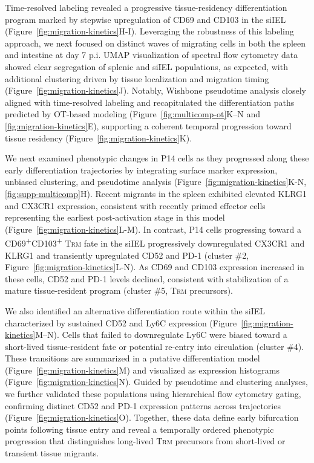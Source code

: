 Time-resolved labeling revealed a progressive tissue-residency differentiation program marked by stepwise upregulation of CD69 and CD103 in the siIEL (Figure~\ref{fig:migration-kinetics}H-I). Leveraging the robustness of this labeling approach, we next focused on distinct waves of migrating cells in both the spleen and intestine at day 7 p.i. UMAP visualization of spectral flow cytometry data showed clear segregation of splenic and siIEL populations, as expected, with additional clustering driven by tissue localization and migration timing (Figure~\ref{fig:migration-kinetics}J). Notably, Wishbone pseudotime analysis closely aligned with time-resolved labeling and recapitulated the differentiation paths predicted by OT-based modeling (Figure~\ref{fig:multicomp-ot}K--N and \ref{fig:migration-kinetics}E), supporting a coherent temporal progression toward tissue residency (Figure~\ref{fig:migration-kinetics}K).

We next examined phenotypic changes in P14 cells as they progressed along these early differentiation trajectories by integrating surface marker expression, unbiased clustering, and pseudotime analysis (Figure~\ref{fig:migration-kinetics}K-N, \ref{fig:supp-multicomp}H). Recent migrants in the spleen exhibited elevated KLRG1 and CX3CR1 expression, consistent with recently primed effector cells representing the earliest post-activation stage in this model (Figure~\ref{fig:migration-kinetics}L-M). In contrast, P14 cells progressing toward a CD69\textsuperscript{+}CD103\textsuperscript{+} T\textsc{rm} fate in the siIEL progressively downregulated CX3CR1 and KLRG1 and transiently upregulated CD52 and PD-1 (cluster \#2, Figure~\ref{fig:migration-kinetics}L-N). As CD69 and CD103 expression increased in these cells, CD52 and PD-1 levels declined, consistent with stabilization of a mature tissue-resident program (cluster \#5, T\textsc{rm} precursors).

We also identified an alternative differentiation route within the siIEL characterized by sustained CD52 and Ly6C expression (Figure~\ref{fig:migration-kinetics}M--N). Cells that failed to downregulate Ly6C were biased toward a short-lived tissue-resident fate or potential re-entry into circulation (cluster \#4). These transitions are summarized in a putative differentiation model (Figure~\ref{fig:migration-kinetics}M) and visualized as expression histograms (Figure~\ref{fig:migration-kinetics}N). Guided by pseudotime and clustering analyses, we further validated these populations using hierarchical flow cytometry gating, confirming distinct CD52 and PD-1 expression patterns across trajectories (Figure~\ref{fig:migration-kinetics}O). Together, these data define early bifurcation points following tissue entry and reveal a temporally ordered phenotypic progression that distinguishes long-lived T\textsc{rm} precursors from short-lived or transient tissue migrants.

